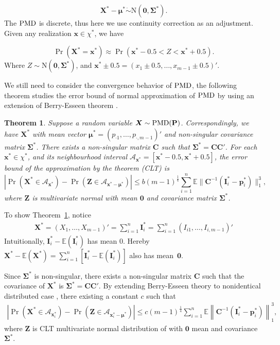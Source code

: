 \documentclass[12pt]{article}
\newcommand{\zerovec}{{\boldsymbol{0}}}
\newcommand{\Ivec}{{\boldsymbol{I}}}
\newcommand{\EE}{\mathbb{E}}
\newcommand{\Cmat}{\mathbf{C}}
\newcommand{\Pmat}{\mathbf{P}}
\newcommand{\pvec}{\boldsymbol{p}}
\newcommand{\N}{\textrm{N}}
\newcommand{\PMD}{{\normalfont\textrm{PMD}}}
\newcommand{\Xvec}{\boldsymbol{X}}
\newcommand{\Zvec}{\boldsymbol{Z}}
\newcommand{\xvec}{\boldsymbol{x}}
\newcommand{\muvec}{\boldsymbol{\mu}}
\newcommand{\Sig}{\boldsymbol{\Sigma}}
\newcommand{\mvec}{\boldsymbol{\mu}}
\newtheorem{thm}{Theorem}
\begin{document}
$$\Xvec^{\ast} - \muvec^{\ast} \dot\sim \N\left(\zerovec, \Sig^{\ast}\right).$$
The $\PMD$ is discrete, thus here we use continuity correction as an adjustment. Given any realization $\xvec \in \chi^{\ast}$, we have

$$\Pr \left( \Xvec^{\ast} = \xvec^{\ast} \right) \approx \Pr \left( \xvec^{\ast} - 0.5 < Z < \xvec^{\ast} + 0.5 \right).$$
Where $Z \sim \N \left(\zerovec, \Sig^{\ast}\right)$, and $\xvec^{\ast}\pm0.5 = (x_1\pm0.5, \dots, x_{m-1}\pm0.5)'.$


We still need to consider the convergence behavior of $\PMD$, the following theorem studies the error bound of normal approximation of $\PMD$ by using an extension of Berry-Esseen theorem .
\begin{thm} \label{thm:normal}
Suppose a random variable $\Xvec \sim \PMD(\Pmat)$. Correspondingly, we have $\Xvec^{\ast}$ with mean vector $\mvec^{\ast} = \left( p_{\cdot1} ,\dots,p_{\cdot,m-1}\right)'$ and non-singular covariance matrix $\Sig^{\ast}$. There exists a non-singular matrix $\Cmat$ such that $\Sig^{\ast} = \Cmat\Cmat'$. For each $\xvec^{\ast}\in \chi^{\ast}$, and its neighbourhood interval $\mathcal{A}_{\xvec^{\ast}} = [\xvec^{\ast}-0.5, \xvec^{\ast}+0.5]$, the error bound of the approximation by the theorem (CLT) is
\begin{equation*}
    |\Pr(\Xvec^{\ast} \in \mathcal{A}_{\xvec^{\ast}}) - \Pr(\Zvec \in \mathcal{A}_{\xvec^{\ast}-\mvec^{\ast}})| \leq b (m-1)^{\frac{1}{4}} \sum_{i=1}^{n}\EE\|\Cmat^{-1}(\Ivec_{i}^{\ast}-\pvec_{i}^{\ast})\|_1^3,
\end{equation*}
where $\Zvec$ is multivariate normal with mean $\zerovec$ and covariance matrix $\Sig^{\ast}$.
\end{thm}
To show Theorem~\ref{thm:normal}, notice
\begin{align*}
    \Xvec^{\ast} = (X_1,\dots,X_{m-1})' = \sum_{i=1}^{n} \Ivec_{i}^{\ast}= \sum_{i=1}^{n} (I_{i1},\dots,I_{i,m-1})'
\end{align*}
Intuitionally, $\Ivec_i^{\ast} - \EE(\Ivec_i^{\ast})$ has mean 0. Hereby $\Xvec^{\ast} - \EE (\Xvec^{\ast}) = \sum_{i=1}^{n} [\Ivec_i^{\ast} - \EE (\Ivec_{i}^{\ast})]$ also has mean~$\zerovec$.

Since $\Sig^{\ast}$ is non-singular, there exists a non-singular matrix $\Cmat$ such that the covariance of $\Xvec^{\ast}$ is $\Sig^{\ast} = \Cmat\Cmat'$. By extending Berry-Esseen theory to nonidentical distributed case \cite{article}, there existing  a constant $c$ such that
\begin{align*}
    |\Pr\left(\Xvec^{\ast} \in \mathcal{A}_{\xvec_i^{\ast}}\right) - \Pr\left(\Zvec \in \mathcal{A}_{\xvec_i^{\ast}-\muvec^{\ast}} \right)| \leq c(m-1)^{\frac{1}{4}}\sum_{i=1}^{n} \EE \left\|\Cmat^{-1}(\Ivec_{i}^{\ast}-\pvec_{i}^{\ast})\right\|_1^3,
\end{align*}
where $\Zvec$ is CLT multivariate normal distribution of with $\zerovec$ mean and covariance $\Sig^{\ast}$.
\end{document}
